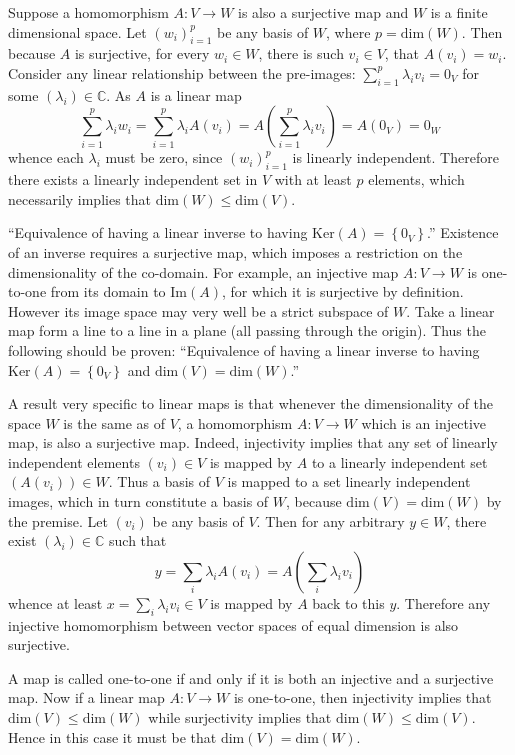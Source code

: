\documentclass[a4paper]{article}
\newcommand{\obj}[1]{\ensuremath{\left\{ #1 \right\}}}
\newcommand{\brac}[1]{\ensuremath{\left( #1 \right)}}
\newcommand{\Dim}[1]{\ensuremath{\text{dim}\brac{ #1 }}}
\newcommand{\Ker}[1]{\ensuremath{\text{Ker}\brac{ #1 }}}
\newcommand{\im}[1]{\ensuremath{\text{Im}\brac{ #1 }}}
\begin{document}
Suppose a homomorphism $A:V\to W$ is also a surjective map and $W$ is a finite dimensional space. Let $\brac{w_i}_{i=1}^p$ be any basis of $W$, where $p = \Dim{W}$. Then because $A$ is surjective, for every $w_i\in W$, there is such $v_i\in V$, that $A\brac{v_i} = w_i$. Consider any linear relationship between the pre-images: $\sum_{i=1}^p \lambda_i v_i = 0_V$ for some $\brac{\lambda_i}\in \mathbb{C}$. As $A$ is a linear map \[\sum_{i=1}^p \lambda_i w_i = \sum_{i=1}^p \lambda_i A\brac{v_i} = A\brac{\sum_{i=1}^p \lambda_i v_i} = A\brac{0_V} = 0_W\] whence each $\lambda_i$ must be zero, since $\brac{w_i}_{i=1}^p$ is linearly independent. Therefore there exists a linearly independent set in $V$ with at least $p$ elements, which necessarily implies that $\Dim{W}\leq \Dim{V}$.

``Equivalence of having a linear inverse to having $\Ker{A} = \obj{0_V}$.'' Existence of an inverse requires a surjective map, which imposes a restriction on the dimensionality of the co-domain. For example, an injective map $A:V\to W$ is one-to-one from its domain to $\im{A}$, for which it is surjective by definition. However its image space may very well be a strict subspace of $W$. Take a linear map form a line to a line in a plane (all passing through the origin). Thus the following should be proven: ``Equivalence of having a linear inverse to having $\Ker{A} = \obj{0_V}$ and $\Dim{V} = \Dim{W}$.''

A result very specific to linear maps is that whenever the dimensionality of the space $W$ is the same as of $V$, a homomorphism $A:V\to W$ which is an injective map, is also a surjective map. Indeed, injectivity implies that any set of linearly independent elements $\brac{v_i} \in V$ is mapped by $A$ to a linearly independent set $\brac{A\brac{v_i}} \in W$. Thus a basis of $V$ is mapped to a set linearly independent images, which in turn constitute a basis of $W$, because $\Dim{V}=\Dim{W}$ by the premise. Let $\brac{v_i}$ be any basis of $V$. Then for any arbitrary $y \in W$, there exist $\brac{\lambda_i}\in \mathbb{C}$ such that \[y = \sum_i \lambda_i A\brac{v_i} = A\brac{\sum_i \lambda_i v_i}\] whence at least $x = \sum_i \lambda_i v_i \in V$ is mapped by $A$ back to this $y$. Therefore any injective homomorphism between vector spaces of equal dimension is also surjective.

A map is called one-to-one if and only if it is both an injective and a surjective map. Now if a linear map $A:V\to W$ is one-to-one, then injectivity implies that $\Dim{V}\leq \Dim{W}$ while surjectivity implies that $\Dim{W} \leq \Dim{V}$. Hence in this case it must be that $\Dim{V}=\Dim{W}$.
\end{document}

